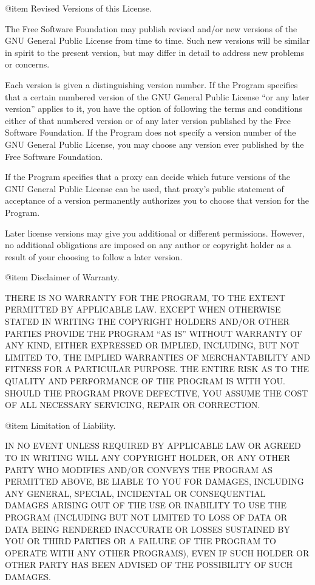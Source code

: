 @item Revised Versions of this License.

The Free Software Foundation may publish revised and/or new versions
of the GNU General Public License from time to time.  Such new
versions will be similar in spirit to the present version, but may
differ in detail to address new problems or concerns.

Each version is given a distinguishing version number.  If the Program
specifies that a certain numbered version of the GNU General Public
License ``or any later version'' applies to it, you have the option of
following the terms and conditions either of that numbered version or
of any later version published by the Free Software Foundation.  If
the Program does not specify a version number of the GNU General
Public License, you may choose any version ever published by the Free
Software Foundation.

If the Program specifies that a proxy can decide which future versions
of the GNU General Public License can be used, that proxy's public
statement of acceptance of a version permanently authorizes you to
choose that version for the Program.

Later license versions may give you additional or different
permissions.  However, no additional obligations are imposed on any
author or copyright holder as a result of your choosing to follow a
later version.

@item Disclaimer of Warranty.

THERE IS NO WARRANTY FOR THE PROGRAM, TO THE EXTENT PERMITTED BY
APPLICABLE LAW.  EXCEPT WHEN OTHERWISE STATED IN WRITING THE COPYRIGHT
HOLDERS AND/OR OTHER PARTIES PROVIDE THE PROGRAM ``AS IS'' WITHOUT
WARRANTY OF ANY KIND, EITHER EXPRESSED OR IMPLIED, INCLUDING, BUT NOT
LIMITED TO, THE IMPLIED WARRANTIES OF MERCHANTABILITY AND FITNESS FOR
A PARTICULAR PURPOSE.  THE ENTIRE RISK AS TO THE QUALITY AND
PERFORMANCE OF THE PROGRAM IS WITH YOU.  SHOULD THE PROGRAM PROVE
DEFECTIVE, YOU ASSUME THE COST OF ALL NECESSARY SERVICING, REPAIR OR
CORRECTION.

@item Limitation of Liability.

IN NO EVENT UNLESS REQUIRED BY APPLICABLE LAW OR AGREED TO IN WRITING
WILL ANY COPYRIGHT HOLDER, OR ANY OTHER PARTY WHO MODIFIES AND/OR
CONVEYS THE PROGRAM AS PERMITTED ABOVE, BE LIABLE TO YOU FOR DAMAGES,
INCLUDING ANY GENERAL, SPECIAL, INCIDENTAL OR CONSEQUENTIAL DAMAGES
ARISING OUT OF THE USE OR INABILITY TO USE THE PROGRAM (INCLUDING BUT
NOT LIMITED TO LOSS OF DATA OR DATA BEING RENDERED INACCURATE OR
LOSSES SUSTAINED BY YOU OR THIRD PARTIES OR A FAILURE OF THE PROGRAM
TO OPERATE WITH ANY OTHER PROGRAMS), EVEN IF SUCH HOLDER OR OTHER
PARTY HAS BEEN ADVISED OF THE POSSIBILITY OF SUCH DAMAGES.

